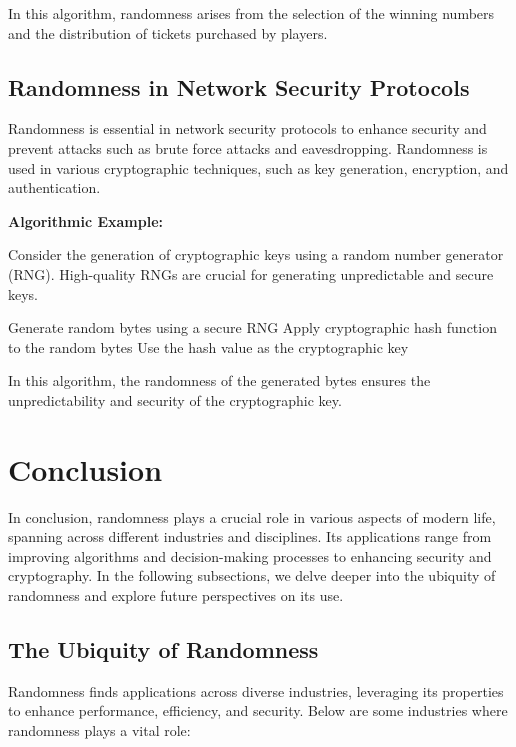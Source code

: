 \documentclass[12pt]{book} %
\begin{document}
In this algorithm, randomness arises from the selection of the winning numbers and the distribution of tickets purchased by players.

\subsection{Randomness in Network Security Protocols}

Randomness is essential in network security protocols to enhance security and prevent attacks such as brute force attacks and eavesdropping. Randomness is used in various cryptographic techniques, such as key generation, encryption, and authentication.

\textbf{Algorithmic Example:}

Consider the generation of cryptographic keys using a random number generator (RNG). High-quality RNGs are crucial for generating unpredictable and secure keys.
\FloatBarrier
\begin{algorithm}[H]
\caption{Key Generation with RNG}
\begin{algorithmic}[1]
\State Generate random bytes using a secure RNG
\State Apply cryptographic hash function to the random bytes
\State Use the hash value as the cryptographic key
\end{algorithmic}
\end{algorithm}
\FloatBarrier

In this algorithm, the randomness of the generated bytes ensures the unpredictability and security of the cryptographic key.


\section{Conclusion}
In conclusion, randomness plays a crucial role in various aspects of modern life, spanning across different industries and disciplines. Its applications range from improving algorithms and decision-making processes to enhancing security and cryptography. In the following subsections, we delve deeper into the ubiquity of randomness and explore future perspectives on its use.

\subsection{The Ubiquity of Randomness}
Randomness finds applications across diverse industries, leveraging its properties to enhance performance, efficiency, and security. Below are some industries where randomness plays a vital role:
\end{document}
